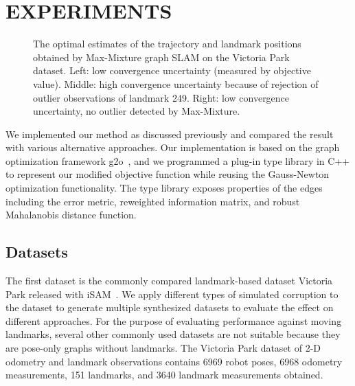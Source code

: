 \section{EXPERIMENTS}

\begin{figure}[!ht]
\caption{The optimal estimates of the trajectory and landmark positions
obtained by Max-Mixture graph SLAM on the Victoria Park dataset.
 Left: low convergence uncertainty
(measured by objective value). Middle: high convergence uncertainty because of
rejection of outlier observations of landmark 249.  Right: low convergence
uncertainty, no outlier detected by Max-Mixture.}
\label{fig:baseline}
\end{figure}

We implemented our method as discussed previously and compared the result with
various alternative approaches. Our implementation is based on the graph
optimization framework g2o~\cite{g2o}, and we programmed a plug-in type library
in C++ to represent our modified objective function while reusing the Gauss-Newton
optimization functionality. The type library exposes properties of the edges including
the error metric, reweighted information matrix, and robust Mahalanobis distance function.

\subsection{Datasets}

The first dataset is the commonly compared landmark-based dataset Victoria Park released with iSAM~\cite{isam}. We apply different types of simulated corruption to the dataset to
generate multiple synthesized datasets to evaluate the effect on different
approaches.  For the purpose of evaluating performance against moving
landmarks, several other commonly used datasets are not suitable because they
are pose-only graphs without landmarks. The Victoria Park dataset of 2-D
odometry and landmark observations contains 6969 robot poses, 6968 odometry
measurements, 151 landmarks, and 3640 landmark measurements obtained.

